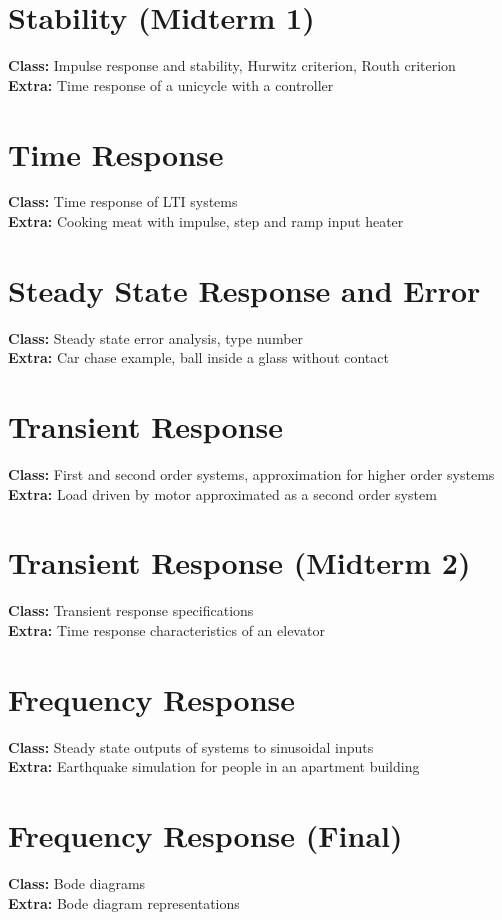 \documentclass[margin]{scrartcl}
\begin{document}
\section{Stability (Midterm 1)}
\textbf{Class:} Impulse response and stability, Hurwitz criterion, Routh criterion \\
\textbf{Extra:} Time response of a unicycle with a controller

\section{Time Response}
\textbf{Class:} Time response of LTI systems \\
\textbf{Extra:} Cooking meat with impulse, step and ramp input heater

\section{Steady State Response and Error}
\textbf{Class:} Steady state error analysis, type number \\
\textbf{Extra:} Car chase example, ball inside a glass without contact

\section{Transient Response}
\textbf{Class:} First and second order systems, approximation for higher order systems \\
\textbf{Extra:} Load driven by motor approximated as a second order system

\section{Transient Response (Midterm 2)} 
\textbf{Class:} Transient response specifications \\
\textbf{Extra:} Time response characteristics of an elevator

\section{Frequency Response}
\textbf{Class:} Steady state outputs of systems to sinusoidal inputs \\
\textbf{Extra:} Earthquake simulation for people in an apartment building

\section{Frequency Response (Final)}
\textbf{Class:} Bode diagrams \\
\textbf{Extra:} Bode diagram representations
\end{document}
